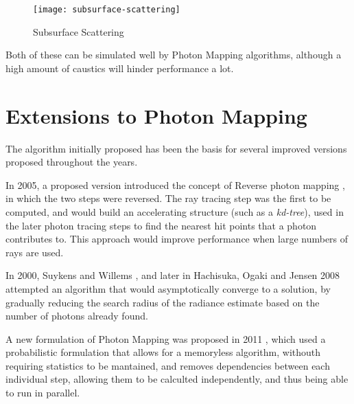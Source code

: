 \documentclass[main.tex]{subfiles}
\begin{document}
\begin{figure}[!htp]
  \centering
  \texttt{[image: subsurface-scattering]}
  \caption{Subsurface Scattering \label{fig:subscat}}
\end{figure}

Both of these can be simulated well by Photon Mapping algorithms, although a high amount of caustics will hinder performance a lot.


\section{Extensions to Photon Mapping}

The algorithm initially proposed \cite{jensen1996global} has been the basis for several improved versions proposed throughout the years.

In 2005, a proposed version introduced the concept of Reverse photon mapping \cite{havran2005fast}, in which the two steps were reversed. The ray tracing step was the first to be computed, and would build an accelerating structure (such as a \textit{kd-tree}), used in the later photon tracing steps to find the nearest hit points that a photon contributes to. This approach would improve performance when large numbers of rays are used.

In 2000, Suykens and Willems \cite{suykens2000adaptive}, and later in Hachisuka, Ogaki and Jensen 2008 \cite{hachisuka2008progressive} attempted an algorithm that would asymptotically converge to a solution, by gradually reducing the search radius of the radiance estimate based on the number of photons already found.

A new formulation of Photon Mapping was proposed in 2011 \cite{knaus2011progressive}, which used a probabilistic formulation that allows for a memoryless algorithm, withouth requiring statistics to be mantained, and removes dependencies between each individual step, allowing them to be calculted independently, and thus being able to run in parallel.
\end{document}

